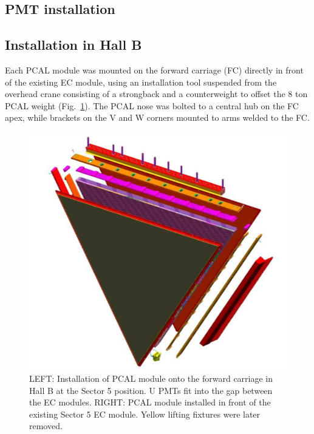 \subsection{PMT installation}
\subsection{Installation in Hall B}
Each PCAL module was mounted on the forward carriage (FC) directly in front of the existing EC module, using an installation tool suspended from the overhead crane consisting of a strongback and a counterweight to offset the 8 ton PCAL weight (Fig.~\ref{fig:S5_1}).  The PCAL nose was bolted to a central hub on the FC apex, while brackets on the V and W corners mounted to arms welded to the FC.   

\begin{figure}[hbt]
\centering
\includegraphics[width=0.95\columnwidth,keepaspectratio]{img/S5_1.png}
\caption{LEFT: Installation of PCAL module onto the forward carriage in Hall B at the Sector 5 position. U PMTs fit into the gap between the EC modules. RIGHT: PCAL module installed in front of the existing Sector 5 EC module. Yellow lifting fixtures were later removed. }
\label{fig:S5_1}
\end{figure}








